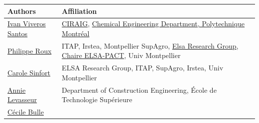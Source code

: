 \documentclass[openany]{book}
\begin{document}
\begin{longtable}[]{@{}ll@{}}
\toprule
\begin{minipage}[b]{0.43\columnwidth}\raggedright
Authors\strut
\end{minipage} & \begin{minipage}[b]{0.51\columnwidth}\raggedright
Affiliation\strut
\end{minipage}\tabularnewline
\midrule
\endhead
\begin{minipage}[t]{0.43\columnwidth}\raggedright
\href{https://ca.linkedin.com/in/ivan-viveros-santos}{Ivan Viveros Santos}\strut
\end{minipage} & \begin{minipage}[t]{0.51\columnwidth}\raggedright
\href{http://ciraig.org}{CIRAIG}, \href{https://www.polymtl.ca/gch/}{Chemical Engineering Department, Polytechnique Montréal}\strut
\end{minipage}\tabularnewline
\begin{minipage}[t]{0.43\columnwidth}\raggedright
\href{http://www.elsa-lca.org/?p=137\&lang=en}{Philippe Roux}\strut
\end{minipage} & \begin{minipage}[t]{0.51\columnwidth}\raggedright
ITAP, Irstea, Montpellier SupAgro, \href{http://www.elsa-lca.org/?lang=en}{Elsa Research Group}, \href{https://www6.inrae.fr/elsa-pact/}{Chaire ELSA-PACT}, Univ Montpellier\strut
\end{minipage}\tabularnewline
\begin{minipage}[t]{0.43\columnwidth}\raggedright
\href{http://www.elsa-lca.org/?tag=carole-sinfort\&lang=en}{Carole Sinfort}\strut
\end{minipage} & \begin{minipage}[t]{0.51\columnwidth}\raggedright
ELSA Research Group, ITAP, SupAgro, Irstea, Univ Montpellier\strut
\end{minipage}\tabularnewline
\begin{minipage}[t]{0.43\columnwidth}\raggedright
\href{https://www.etsmtl.ca/en/research/professors/alevasseur/}{Annie Levasseur}\strut
\end{minipage} & \begin{minipage}[t]{0.51\columnwidth}\raggedright
Department of Construction Engineering, École de Technologie Supérieure\strut
\end{minipage}\tabularnewline
\begin{minipage}[t]{0.43\columnwidth}\raggedright
\href{https://professeurs.uqam.ca/professeur/bulle.cecile/}{Cécile Bulle}\strut

\end{minipage}
\end{longtable}
\end{document}
